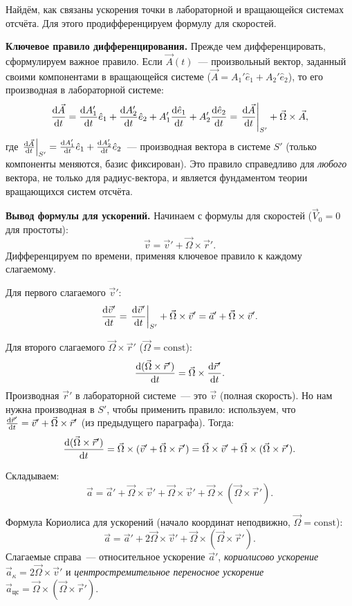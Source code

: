 \documentclass[../main.tex]{subfiles}
\begin{document}
Найдём, как связаны ускорения точки в лабораторной и вращающейся
системах отсчёта. Для этого продифференцируем формулу для скоростей.

\noindent\textbf{Ключевое правило дифференцирования.}
Прежде чем дифференцировать, сформулируем важное правило.
Если $\vec{A}(t)$~--- произвольный вектор, заданный своими
компонентами в вращающейся системе ($\vec{A} = A_1'\hat{e}_1 + A_2'\hat{e}_2$),
то его производная в лабораторной системе:
\[
    \dv{\vec{A}}{t} = \dv{A_1'}{t}\hat{e}_1 + \dv{A_2'}{t}\hat{e}_2
    + A_1'\dv{\hat{e}_1}{t} + A_2'\dv{\hat{e}_2}{t}
    = \left.\dv{\vec{A}}{t}\right|_{S'} + \vec{\Omega}\times\vec{A},
\]
где $\left.\dv{\vec{A}}{t}\right|_{S'} = \dv{A_1'}{t}\hat{e}_1 + \dv{A_2'}{t}\hat{e}_2$~---
производная вектора в системе $S'$ (только компоненты меняются,
базис фиксирован).
Это правило справедливо для \textit{любого} вектора, не только
для радиус-вектора, и является фундаментом теории вращающихся
систем отсчёта.

\noindent\textbf{Вывод формулы для ускорений.}
Начинаем с формулы для скоростей ($\vec{V}_0 = 0$ для простоты):
\[
    \vec{v} = \vec{v}' + \vec{\Omega}\times\vec{r}'.
\]
Дифференцируем по времени, применяя ключевое правило к каждому слагаемому.

Для первого слагаемого $\vec{v}'$:
\[
    \dv{\vec{v}'}{t} = \left.\dv{\vec{v}'}{t}\right|_{S'} + \vec{\Omega}\times\vec{v}' = \vec{a}' + \vec{\Omega}\times\vec{v}'.
\]

Для второго слагаемого $\vec{\Omega}\times\vec{r}'$ ($\vec{\Omega} = \mathrm{const}$):
\[
    \dv{(\vec{\Omega}\times\vec{r}')}{t} = \vec{\Omega}\times\dv{\vec{r}'}{t}.
\]
Производная $\vec{r}'$ в лабораторной системе~--- это $\vec{v}$ (полная скорость).
Но нам нужна производная в $S'$, чтобы применить правило: используем,
что $\dv{\vec{r}'}{t} = \vec{v}' + \vec{\Omega}\times\vec{r}'$
(из предыдущего параграфа). Тогда:
\[
    \dv{(\vec{\Omega}\times\vec{r}')}{t} = \vec{\Omega}\times(\vec{v}' + \vec{\Omega}\times\vec{r}') = \vec{\Omega}\times\vec{v}' + \vec{\Omega}\times(\vec{\Omega}\times\vec{r}').
\]

Складываем:
\[
    \vec{a} = \vec{a}' + \vec{\Omega}\times\vec{v}' + \vec{\Omega}\times\vec{v}' + \vec{\Omega}\times(\vec{\Omega}\times\vec{r}').
\]

\begin{definition}
Формула Кориолиса для ускорений (начало координат неподвижно,
$\vec{\Omega} = \mathrm{const}$):
\[
    \vec{a} = \vec{a}' + 2\vec{\Omega}\times\vec{v}' + \vec{\Omega}\times(\vec{\Omega}\times\vec{r}').
\]
Слагаемые справа~--- относительное ускорение $\vec{a}'$,
\textit{кориолисово ускорение} $\vec{a}_\kappa = 2\vec{\Omega}\times\vec{v}'$
и \textit{центростремительное переносное ускорение}
$\vec{a}_{\text{цс}} = \vec{\Omega}\times(\vec{\Omega}\times\vec{r}')$.
\end{definition}
\end{document}
